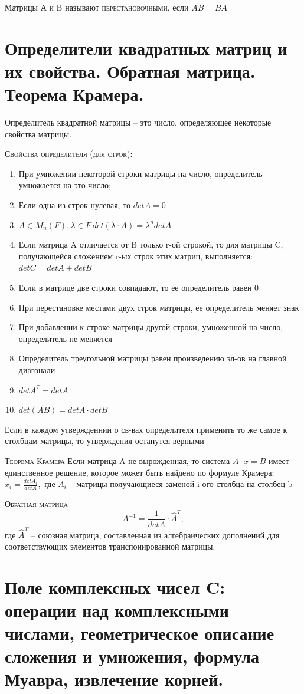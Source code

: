 \documentclass{article}
\begin{document}
Матрицы А и B называют \textsc{перестановочными}, если $AB=BA$

\section{Определители квадратных матриц и их свойства. Обратная матрица. Теорема Крамера.}
Определитель квадратной матрицы – это число, определяющее некоторые свойства матрицы.

\textsc{Свойства определителя (для строк):}
\begin{enumerate}
    \item При умножении некоторой строки матрицы на число, определитель умножается на это число;
    \item Если одна из строк нулевая, то $det A=0$
    \item $A\in M_n(F), \lambda \in F \ det(\lambda\cdot A)=\lambda^ndet A$
    \item Если матрица A отличается от B только r-ой строкой, то для матрицы C, получающейся сложением r-ых строк этих матриц, выполняется: $det C=det A+det B$
    \item Если в матрице две строки совпадают, то ее определитель равен 0
    \item При перестановке местами двух строк матрицы, ее определитель меняет знак
    \item При добавлении к строке матрицы другой строки, умноженной на число, определитель не меняется
    \item Определитель треугольной матрицы равен произведению эл-ов на главной диагонали
    \item $det A^T=det A$
    \item $det(AB)=det A\cdot det B$
\end{enumerate}
Если в каждом утвержденнии о св-вах определителя применить то же самое к столбцам матрицы, то утверждения останутся верными

\textsc{Теорема Крамера} Если матрица A не вырожденная, то система $A\cdot x=B$ имеет единственное решение,
которое может быть найдено по формуле Крамера: $x_i=\frac{det A_i}{det A}$, где $A_i$ – матрицы получающиеся заменой i-ого столбца на столбец b

\textsc{Обратная матрица}
$$A^{-1}=\frac{1}{det A}\cdot \hat{A}^T,$$
где $\hat{A}^T$ – союзная матрица, составленная из алгебраических дополнений для соответствующих элементов транспонированной матрицы.

\section{Поле комплексных чисел C: операции над комплексными числами, геометрическое описание сложения и умножения, формула Муавра, извлечение корней.}
\end{document}
